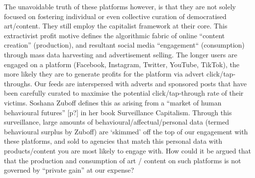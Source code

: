 The unavoidable truth of these platforms however, is that they are not solely focused on fostering individual or even collective curation of democratised art/content. They still employ the capitalist framework at their core. This extractivist profit motive defines the algorithmic fabric of online “content creation” (production), and resultant social media “engagement“ (consumption) through mass data harvesting and advertisement selling. The longer users are engaged on a platform (Facebook, Instagram, Twitter, YouTube, TikTok), the more likely they are to generate profits for the platform via advert click/tap-throughs. Our feeds are interspersed with adverts and sponsored posts that have been carefully curated to maximise the potential click/tap-through rate of their victims. Soshana Zuboff defines this as arising from a “market of human behavioural futures” [p?] in her book Surveillance Capitalism. Through this surveillance, large amounts of behavioural/affectual/personal data (termed behavioural surplus by Zuboff) are ‘skimmed’ off the top of our engagement with these platforms, and sold to agencies that match this personal data with products/content you are most likely to engage with. How could it be argued that that the production and consumption of art / content on such platforms is not governed by “private gain” at our expense? 

